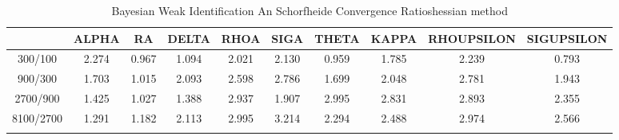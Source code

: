 \documentclass[a4paper,10pt]{article}
\begin{document}
\centering
\begin{longtable}{cccccccccc}
\toprule
 & ALPHA & RA & DELTA & RHOA & SIGA & THETA & KAPPA & RHOUPSILON & SIGUPSILON \\
\midrule
300/100 & 2.274 & 0.967 & 1.094 & 2.021 & 2.130 & 0.959 & 1.785 & 2.239 & 0.793 \\
900/300 & 1.703 & 1.015 & 2.093 & 2.598 & 2.786 & 1.699 & 2.048 & 2.781 & 1.943 \\
2700/900 & 1.425 & 1.027 & 1.388 & 2.937 & 1.907 & 2.995 & 2.831 & 2.893 & 2.355 \\
8100/2700 & 1.291 & 1.182 & 2.113 & 2.995 & 3.214 & 2.294 & 2.488 & 2.974 & 2.566 \\
\bottomrule
\caption{Bayesian Weak Identification An Schorfheide Convergence Ratioshessian method}
\label{table:tbl:WeakAnSchoConvergenceRatios_hessian}
\end{longtable}
\end{document}
